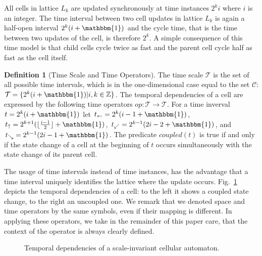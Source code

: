 \documentclass[pre,showpacs,showkeys,preprint]{revtex4}
\theoremstyle{definition}
\newtheorem{defn}{Definition}
\begin{document}
All cells in lattice $L_k$ are updated synchronously at time instances $2^k i$ where $i$ is an integer.
The time interval between two cell updates in lattice $L_k$ is again a half-open interval $2^k (i + \mathbbm{1})$
and the cycle time, that is the time between two updates of the cell, is therefore $2^k$.
A simple consequence of this time model is that child cells cycle twice as fast and the parent cell cycle
half as fast as the cell itself.
\begin{defn}[Time Scale and Time Operators]
The time scale $\mathcal{T}$ is the set of all possible time intervals, which is in the one-dimensional
case equal to the set $\mathcal{C}$: $\mathcal{T} = \{ 2^k (i + \mathbbm{1}) | i, k \in \mathbb Z\}$.
The temporal dependencies of a cell are expressed by the following time operators $\mathit{op}: \mathcal{T} \rightarrow \mathcal{T}$.
For a time inverval $t = 2^k (i + \mathbbm{1})$ let
$t_\leftarrow = 2^k (i - 1 + \mathbbm{1})$,
$t_\uparrow = 2^{k + 1} (\lfloor \frac{i-1}{2} \rfloor + \mathbbm{1})$,
$t_\swarrow = 2^{k-1} (2i - 2  + \mathbbm{1})$, and
$t_\searrow =  2^{k-1} (2i - 1 + \mathbbm{1})$.
The predicate $\mathit{coupled}(t)$ is true if and only if the state change of a cell at the beginning of $t$ occurs
simultaneously with the state change of its parent cell.
\end{defn}
The usage of time intervals instead of time instances, has the advantage
that a time interval uniquely identifies the lattice where the update occurs.
Fig.~\ref{fig:timeops} depicts the temporal dependencies of a cell: to the left it shows a
coupled state change, to the right an uncoupled one.
We remark that we denoted space and time operators by the same symbols, even if their mapping is different.
In applying these operators, we take in the remainder of this paper care, that the context of the operator is always clearly defined.

\begin{figure}
\begin{center}
\caption{\label{fig:timeops} Temporal dependencies of a scale-invariant cellular automaton.}
\end{center}
\end{figure}
\end{document}
